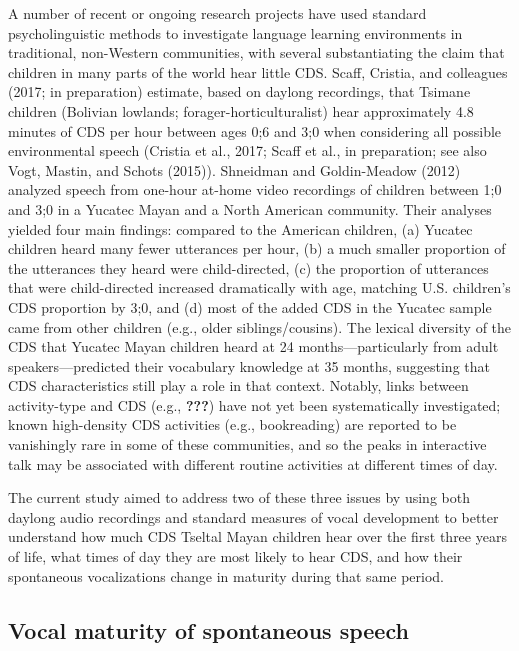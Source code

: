 \documentclass[floatsintext,man]{apa6}
\theoremstyle{definition}
\theoremstyle{definition}
\theoremstyle{definition}
\theoremstyle{remark}
\begin{document}
A number of recent or ongoing research projects have used standard
psycholinguistic methods to investigate language learning environments
in traditional, non-Western communities, with several substantiating the
claim that children in many parts of the world hear little CDS. Scaff,
Cristia, and colleagues (2017; in preparation) estimate, based on
daylong recordings, that Tsimane children (Bolivian lowlands;
forager-horticulturalist) hear approximately 4.8 minutes of CDS per hour
between ages 0;6 and 3;0 when considering all possible environmental
speech (Cristia et al., 2017; Scaff et al., in preparation; see also
Vogt, Mastin, and Schots (2015)). Shneidman and Goldin-Meadow (2012)
analyzed speech from one-hour at-home video recordings of children
between 1;0 and 3;0 in a Yucatec Mayan and a North American community.
Their analyses yielded four main findings: compared to the American
children, (a) Yucatec children heard many fewer utterances per hour, (b)
a much smaller proportion of the utterances they heard were
child-directed, (c) the proportion of utterances that were
child-directed increased dramatically with age, matching U.S. children's
CDS proportion by 3;0, and (d) most of the added CDS in the Yucatec
sample came from other children (e.g., older siblings/cousins). The
lexical diversity of the CDS that Yucatec Mayan children heard at 24
months---particularly from adult speakers---predicted their vocabulary
knowledge at 35 months, suggesting that CDS characteristics still play a
role in that context. Notably, links between activity-type and CDS
(e.g., {\textbf{???}}) have not yet been systematically investigated;
known high-density CDS activities (e.g., bookreading) are reported to be
vanishingly rare in some of these communities, and so the peaks in
interactive talk may be associated with different routine activities at
different times of day.

The current study aimed to address two of these three issues by using
both daylong audio recordings and standard measures of vocal development
to better understand how much CDS Tseltal Mayan children hear over the
first three years of life, what times of day they are most likely to
hear CDS, and how their spontaneous vocalizations change in maturity
during that same period.

\subsection{Vocal maturity of spontaneous
speech}\label{vocal-maturity-of-spontaneous-speech}
\end{document}
